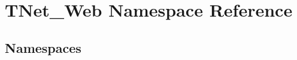 \hypertarget{namespace_t_net___web}{}\section{T\+Net\+\_\+\+Web Namespace Reference}
\label{namespace_t_net___web}
\subsection*{Namespaces}
\begin{DoxyCompactItemize}
\end{DoxyCompactItemize}

